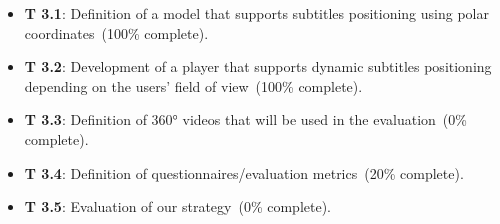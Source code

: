 \begin{itemize}
    \item \textbf{T 3.1}: Definition of a model that supports subtitles positioning using polar coordinates~(100\% complete).
    \item \textbf{T 3.2}: Development of a player that supports dynamic subtitles positioning depending on the users' field of view~(100\% complete).
    \item \textbf{T 3.3}: Definition of 360° videos that will be used in the evaluation~(0\% complete).
    \item \textbf{T 3.4}: Definition of questionnaires/evaluation metrics~(20\% complete).
    \item \textbf{T 3.5}: Evaluation of our strategy~(0\% complete).
\end{itemize}